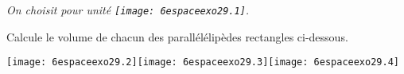 {\em On choisit pour unité \texttt{[image: 6espaceexo29.1]}.}
\par Calcule le volume de chacun des parallélélipèdes rectangles
ci-dessous.
\par
\texttt{[image: 6espaceexo29.2]}\hfill\texttt{[image: 6espaceexo29.3]}\hfill\texttt{[image: 6espaceexo29.4]}